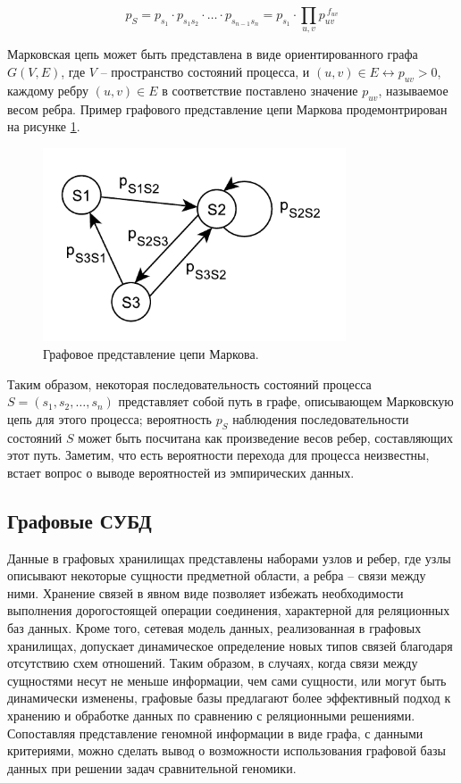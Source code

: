 \begin{equation}
	p_S=p_{s_1}\cdot p_{s_1s_2}\cdot\ldots\cdot p_{s_{n-1}s_n}=p_{s_1}\cdot\prod_{u,v} p_{uv}^{\ f_{uv}}
	\label{eq:mc_note2}
\end{equation}

Марковская цепь может быть представлена в виде ориентированного графа $ G\left(V,E\right) $, где $ V $ -- пространство состояний процесса, и $ \left(u,v\right)\in E\leftrightarrow p_{uv}>0 $, каждому ребру $ \left(u,v\right)\in E $ в соответствие поставлено значение $ p_{uv} $, называемое весом ребра. Пример графового представление цепи Маркова продемонтрирован на рисунке \ref{fig:mc_ex}.

\begin{figure}[htbp]
	\centering
	\includegraphics[width=0.8\textwidth]{img/mc_ex.pdf}
	\caption{Графовое представление цепи Маркова.}
	\label{fig:mc_ex}
\end{figure}

Таким образом, некоторая последовательность состояний процесса $ S=\left(s_1,s_2,\ldots,s_n\right) $ представляет собой путь в графе, описывающем Марковскую цепь для этого процесса; вероятность $ p_S $ наблюдения последовательности состояний $ S $ может быть посчитана как произведение весов ребер, составляющих этот путь. Заметим, что есть вероятности перехода для процесса неизвестны, встает вопрос о выводе вероятностей из эмпирических данных.

\subsection{Графовые СУБД}
Данные в графовых хранилищах представлены наборами узлов и ребер, где узлы описывают некоторые сущности предметной области, а ребра – связи между ними. Хранение связей в явном виде позволяет избежать необходимости выполнения дорогостоящей операции соединения, характерной для реляционных баз данных. Кроме того, сетевая модель данных, реализованная в графовых хранилищах, допускает динамическое определение новых типов связей благодаря отсутствию схем отношений. Таким образом, в случаях, когда связи между сущностями несут не меньше информации, чем сами сущности, или могут быть динамически изменены, графовые базы предлагают более эффективный\cite{20_batra2012comparative,21_medhi2017relational} подход к хранению и обработке данных по сравнению с реляционными решениями. Сопоставляя представление геномной информации в виде графа, с данными критериями, можно сделать вывод о возможности использования графовой базы данных при решении задач сравнительной геномики\cite{22_miller2013graph}.

\pagebreak